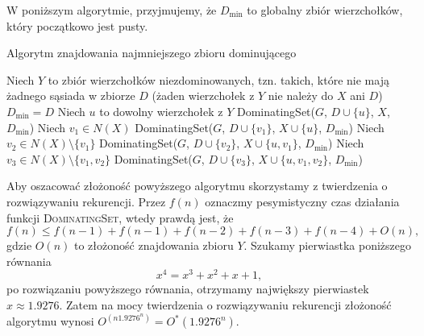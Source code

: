 W poniższym algorytmie, przyjmujemy, że $D_{\min}$ to globalny zbiór
wierzchołków, który początkowo jest pusty.
\begin{algorithm}[H]
	\caption{Algorytm znajdowania najmniejszego zbioru dominującego}
	\begin{algorithmic}[1]
		\State \Return
		\State Niech $Y$ to zbiór wierzchołków niezdominowanych, tzn. takich, które nie mają żadnego sąsiada w zbiorze $D$ (żaden
		wierzchołek z $Y$ nie należy do $X$ ani $D$)
		\EndIf		
		\State $D_{\min} = D$
		\EndIf
		\State \Return
		\EndIf
		\State Niech $u$ to dowolny wierzchołek z $Y$
		\State DominatingSet($G$, $D \cup \{u\}$, $X$, $D_{\min}$)
		\State Niech $v_1 \in N(X)$
		\State DominatingSet($G$, $D \cup \{v_1\}$, $X \cup \{u\}$, $D_{\min}$)
		\EndIf
		\EndIf
		\State Niech $v_2 \in N(X) \setminus \{v_1\}$
		\State DominatingSet($G$, $D \cup \{v_2\}$, $X \cup \{u, v_1\}$, $D_{\min}$)
		\EndIf
		\EndIf
		\State Niech $v_3 \in N(X) \setminus \{v_1, v_2\}$
		\State DominatingSet($G$, $D \cup \{v_3\}$, $X \cup \{u, v_1, v_2\}$, $D_{\min}$)
		\EndIf
		\EndIf
		\EndProcedure		
	\end{algorithmic}
\end{algorithm}

Aby oszacować złożoność powyższego algorytmu skorzystamy z 
twierdzenia o rozwiązywaniu rekurencji. Przez $f(n)$
oznaczmy pesymistyczny czas działania funkcji \textsc{DominatingSet},
wtedy prawdą jest, że
\[f(n) \leq f(n-1) + f(n-1) + f(n-2) + f(n-3) + f(n-4) + O(n),\]
gdzie $O(n)$ to złożoność znajdowania zbioru $Y$. 
Szukamy pierwiastka poniższego równania
\[x^4 = x^3 + x^2 + x + 1,\]
po rozwiązaniu powyższego równania, otrzymamy największy
pierwiastek $x \approx 1.9276$. Zatem na mocy twierdzenia
o rozwiązywaniu rekurencji złożoność algorytmu wynosi $O^(n1.9276^n) = O^*(1.9276^n)$.
